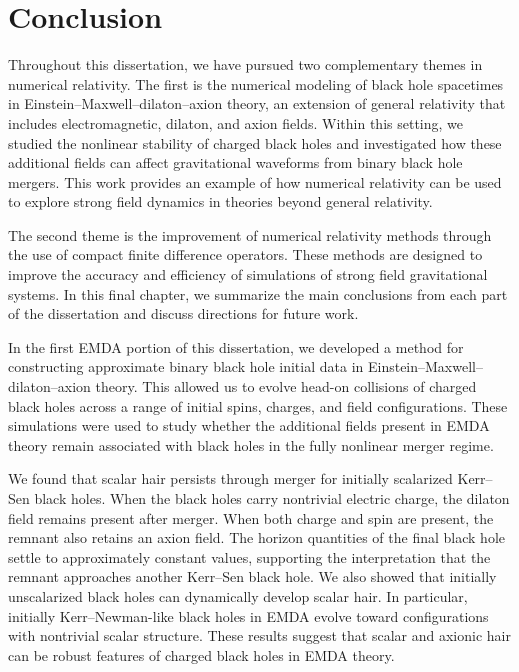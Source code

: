 \section{Conclusion}

Throughout this dissertation, we have pursued two complementary themes in numerical relativity. The first is the numerical modeling of black hole spacetimes in Einstein--Maxwell--dilaton--axion theory, an extension of general relativity that includes electromagnetic, dilaton, and axion fields. Within this setting, we studied the nonlinear stability of charged black holes and investigated how these additional fields can affect gravitational waveforms from binary black hole mergers. This work provides an example of how numerical relativity can be used to explore strong field dynamics in theories beyond general relativity.

The second theme is the improvement of numerical relativity methods through the use of compact finite difference operators. These methods are designed to improve the accuracy and efficiency of simulations of strong field gravitational systems. In this final chapter, we summarize the main conclusions from each part of the dissertation and discuss directions for future work.

In the first EMDA portion of this dissertation, we developed a method for constructing approximate binary black hole initial data in Einstein--Maxwell--dilaton--axion theory. This allowed us to evolve head-on collisions of charged black holes across a range of initial spins, charges, and field configurations. These simulations were used to study whether the additional fields present in EMDA theory remain associated with black holes in the fully nonlinear merger regime.

We found that scalar hair persists through merger for initially scalarized Kerr--Sen black holes. When the black holes carry nontrivial electric charge, the dilaton field remains present after merger. When both charge and spin are present, the remnant also retains an axion field. The horizon quantities of the final black hole settle to approximately constant values, supporting the interpretation that the remnant approaches another Kerr--Sen black hole. We also showed that initially unscalarized black holes can dynamically develop scalar hair. In particular, initially Kerr--Newman-like black holes in EMDA evolve toward configurations with nontrivial scalar structure. These results suggest that scalar and axionic hair can be robust features of charged black holes in EMDA theory.

